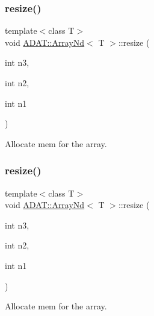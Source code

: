 \subsubsection{\texorpdfstring{resize()}{resize()}\hspace{0.1cm}{\footnotesize\ttfamily [7/10]}}
{\footnotesize\ttfamily template$<$class T$>$ \\
void \mbox{\hyperlink{classADAT_1_1ArrayNd}{A\+D\+A\+T\+::\+Array\+Nd}}$<$ T $>$\+::resize (\begin{DoxyParamCaption}\item[{int}]{n3,  }\item[{int}]{n2,  }\item[{int}]{n1 }\end{DoxyParamCaption})\hspace{0.3cm}{\ttfamily [inline]}}



Allocate mem for the array. 

\mbox{\label{classADAT_1_1ArrayNd_a1b042ead88dae6696d7a0c77fd01ddfa}} 
\subsubsection{\texorpdfstring{resize()}{resize()}\hspace{0.1cm}{\footnotesize\ttfamily [8/10]}}
{\footnotesize\ttfamily template$<$class T$>$ \\
void \mbox{\hyperlink{classADAT_1_1ArrayNd}{A\+D\+A\+T\+::\+Array\+Nd}}$<$ T $>$\+::resize (\begin{DoxyParamCaption}\item[{int}]{n3,  }\item[{int}]{n2,  }\item[{int}]{n1 }\end{DoxyParamCaption})\hspace{0.3cm}{\ttfamily [inline]}}



Allocate mem for the array. 

\mbox{\label{classADAT_1_1ArrayNd_a2a54d490a8a0a7aa9aeeaee6e6a84b90}} 
